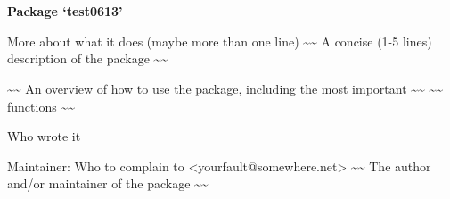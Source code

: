 \documentclass[a4paper]{book}
\begin{document}
\chapter*{}
\begin{center}
{\textbf{\huge Package `test0613'}}
\par\bigskip{\large \today}
\end{center}
\begin{description}
\raggedright{}
\item[Type]
\item[Title]
\item[Version]
\item[Date]
\item[Author]
\item[Maintainer]\AsIs{}
\item[Description]
\item[License]
\end{description}
%
\begin{Description}\relax
More about what it does (maybe more than one line)
\textasciitilde{}\textasciitilde{} A concise (1-5 lines) description of the package \textasciitilde{}\textasciitilde{}
\end{Description}
%
\begin{Details}\relax

\textasciitilde{}\textasciitilde{} An overview of how to use the package, including the most important \textasciitilde{}\textasciitilde{}
\textasciitilde{}\textasciitilde{} functions \textasciitilde{}\textasciitilde{}
\end{Details}
%
\begin{Author}\relax
Who wrote it

Maintainer: Who to complain to <yourfault@somewhere.net>
\textasciitilde{}\textasciitilde{} The author and/or maintainer of the package \textasciitilde{}\textasciitilde{}
\end{Author}
\end{document}
